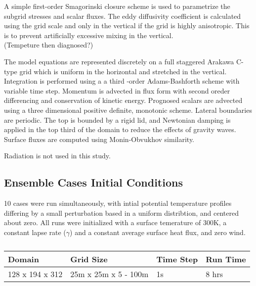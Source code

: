 A simple first-order Smagorinski closure scheme is used to parametrize the subgrid stresses and scalar fluxes. The eddy diffusivity coefficient is calculated using the
grid scale and only in the vertical if the grid is highly anisotropic.  This is to prevent artificially excessive mixing in the vertical.\\

(Tempeture then diagnosed?)

The model equations are represented discretely on a full staggered Arakawa C-type grid which is uniform in the horizontal and stretched in the vertical. Integration is performed
using a a third -order Adams-Bashforth scheme with variable time step.  Momentum is advected in flux form with second oreder differencing and conservation of kinetic energy. 
Prognosed scalars are advected using a three dimensional positive definite, monotonic scheme.  Lateral boundaries are periodic.  The top is bounded by a rigid lid, and
Newtonian damping is applied in the top third of the domain to reduce the effects of gravity waves.  Surface fluxes are computed using Monin-Obvukhov similarity.

Radiation is not used in this study.\\


\subsection{Ensemble Cases Initial Conditions}

10 cases were run simultaneously, with intial potential temperature profiles differing by a small perturbation based in
a uniform distribtion, and centered about zero.  All runs were initialized with a surface temerature of 300K, a constant
lapse rate ($\gamma$) and a constant average surface heat flux, and zero wind.\\

\begin{table}[!ht]
    \begin{center}
    \begin{tabular}{ | l | l | l | l |}
    \hline
     Domain & Grid Size & Time Step & Run Time  \\ \hline
     128 x 194 x 312 & 25m x 25m x 5 - 100m  & 1s & 8 hrs \\ \hline
\end{tabular}
\caption{}
\label{fig:}   
\end{center}    
\end{table}

